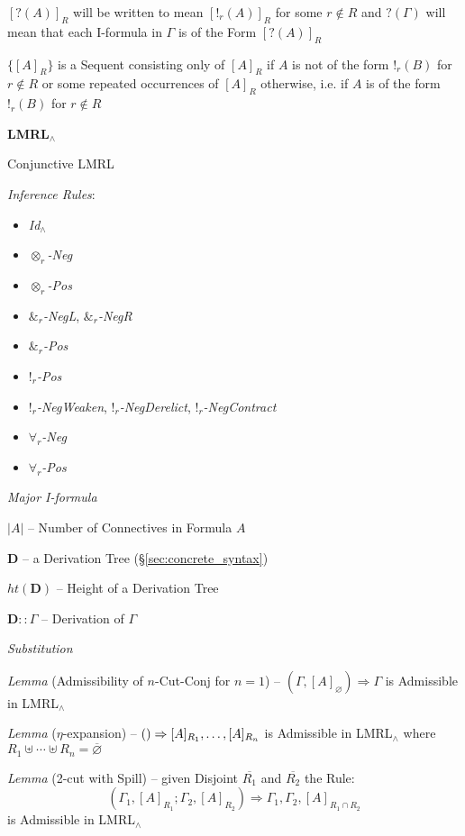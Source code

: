 $[?(A)]_R$ will be written to mean $[!_r(A)]_R$ for some $r \notin R$
and $?(\Gamma)$ will mean that each I-formula in $\Gamma$ is of the
Form $[?(A)]_R$

$\{[A]_R\}$ is a Sequent consisting only of $[A]_R$ if $A$ is not of
the form $!_r(B)$ for $r \notin R$ or some repeated occurrences of
$[A]_R$ otherwise, i.e. if $A$ is of the form $!_r(B)$ for $r \notin
R$ %


\textbf{LMRL$_\wedge$}

Conjunctive LMRL

\emph{Inference Rules}:
\begin{itemize}
  \item \emph{Id$_\wedge$}
  \item \emph{$\otimes_r$-Neg}
  \item \emph{$\otimes_r$-Pos}
  \item \emph{$\&_r$-NegL}, \emph{$\&_r$-NegR}
  \item \emph{$\&_r$-Pos}
  \item \emph{$!_r$-Pos}
  \item \emph{$!_r$-NegWeaken}, \emph{$!_r$-NegDerelict},
    \emph{$!_r$-NegContract}
  \item \emph{$\forall_r$-Neg}
  \item \emph{$\forall_r$-Pos}
\end{itemize}

\emph{Major I-formula} %

$|A|$ -- Number of Connectives in Formula $A$

$\mathbf{D}$ -- a Derivation Tree (\S\ref{sec:concrete_syntax})

$ht(\mathbf{D})$ -- Height of a Derivation Tree

$\mathbf{D} :: \Gamma$ -- Derivation of $\Gamma$

\emph{Substitution} %

\emph{Lemma} (Admissibility of $n$-Cut-Conj for $n = 1$) -- $(\Gamma,
     [A]_\varnothing) \Rightarrow \Gamma$ is Admissible in
     LMRL$_\wedge$

\emph{Lemma} ($\eta$-expansion) -- $\mathsf{()} \Rightarrow [A]_{R_1}, \ldots,
     [A]_{R_n}$ is Admissible in LMRL$_\wedge$ where $R_1 \uplus
     \cdots \uplus R_n = \overline{\varnothing}$

\emph{Lemma} (2-cut with Spill) -- given Disjoint $\overline{R_1}$ and
$\overline{R_2}$ the Rule:
\[
  (\Gamma_1, [A]_{R_1}; \Gamma_2,[A]_{R_2}) \Rightarrow
    \Gamma_1, \Gamma_2, [A]_{R_1 \cap R_2}
\]
is Admissible in LMRL$_\wedge$

